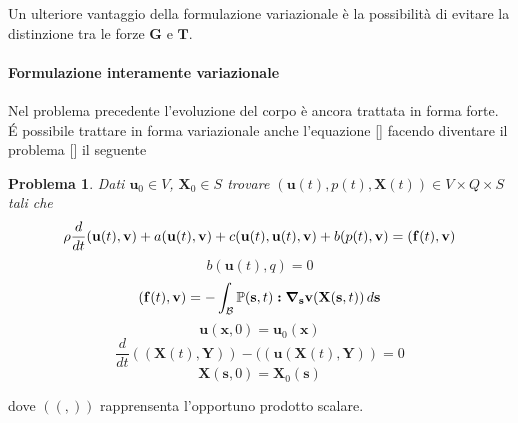 \documentclass{book}
\newtheorem{problem}[theorem]{Problema}
\newcommand{\Nabla}{\boldsymbol{\nabla}}
\begin{document}
Un ulteriore vantaggio della formulazione variazionale è la possibilità di evitare la distinzione tra le forze $\mathbf{G}$ e $\mathbf{T}$.

\paragraph{Formulazione interamente variazionale}
Nel problema precedente l'evoluzione del corpo è ancora trattata in forma forte. \'E possibile trattare in forma variazionale anche l'equazione [] facendo diventare il problema [] il seguente
\begin{problem}
Dati $\mathbf{u}_0\in V$, $\mathbf{X}_0\in S$ trovare $(\mathbf{u}(t),p(t),\mathbf{X}(t))\in V\times Q\times S$ tali che
$$\rho\frac{d}{dt}\ps{\mathbf{u}(t)}{\mathbf{v}}+a\ps{\mathbf{u}(t)}{\mathbf{v}}+c({\mathbf{u}(t)},{\mathbf{u}(t)},{\mathbf{v}})+b(p(t),\mathbf{v})=\ps{\mathbf{f}(t)}{\mathbf{v}}$$
$$b(\mathbf{u}(t),q)=0$$
$$\ps{\mathbf{f}(t)}{\mathbf{v}}=-\int_{\mathcal{B}}\mathbb{P}(\mathbf{s},t)\boldsymbol{:}\Nabla_{\mathbf{s}}\mathbf{v}(\mathbf{X}(\mathbf{s},t))\, d\mathbf{s}$$
$$\mathbf{u}(\mathbf{x},0)=\mathbf{u}_0(\mathbf{x})$$
$$\frac{d}{dt}((\mathbf{X}(t),\mathbf{Y}))-((\mathbf{u}(\mathbf{X}(t),\mathbf{Y}))=0$$
$$\mathbf{X}(\mathbf{s},0)=\mathbf{X}_0(\mathbf{s})$$
\end{problem}
dove $(( , ))$ rapprensenta l'opportuno prodotto scalare.
\end{document}
